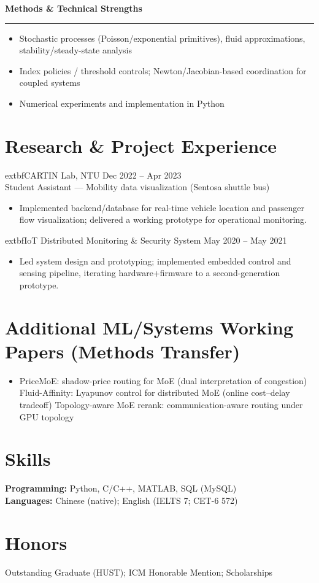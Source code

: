 \documentclass[11pt,a4paper]{article}
\newcommand{\cvsection}[1]{\vspace{2pt}\noindent\textbf{\large #1}\\[-2pt]\textcolor{cvgray}{\rule{\linewidth}{0.4pt}}\vspace{2pt}}
\begin{document}
\cvsection{Methods \& Technical Strengths}
\begin{itemize}
  \item Stochastic processes (Poisson/exponential primitives), fluid approximations, stability/steady-state analysis
  \item Index policies / threshold controls; Newton/Jacobian-based coordination for coupled systems
  \item Numerical experiments and implementation in Python
\end{itemize}

\section*{Research \& Project Experience}
	extbf{CARTIN Lab, NTU} \hfill Dec 2022 -- Apr 2023\\
Student Assistant --- Mobility data visualization (Sentosa shuttle bus)\\[-3pt]
\begin{itemize}
  \item Implemented backend/database for real-time vehicle location and passenger flow visualization; delivered a working prototype for operational monitoring.
\end{itemize}

	extbf{IoT Distributed Monitoring \& Security System} \hfill May 2020 -- May 2021\\[-3pt]
\begin{itemize}
  \item Led system design and prototyping; implemented embedded control and sensing pipeline, iterating hardware+firmware to a second-generation prototype.
\end{itemize}

\section*{Additional ML/Systems Working Papers (Methods Transfer)}
\begin{itemize}
  \item PriceMoE: shadow-price routing for MoE (dual interpretation of congestion)\;
  Fluid-Affinity: Lyapunov control for distributed MoE (online cost--delay tradeoff)\;
  Topology-aware MoE rerank: communication-aware routing under GPU topology
\end{itemize}

\section*{Skills}
\textbf{Programming:} Python, C/C++, MATLAB, SQL (MySQL)\\
\textbf{Languages:} Chinese (native); English (IELTS 7; CET-6 572)

\section*{Honors}
Outstanding Graduate (HUST); ICM Honorable Mention; Scholarships
\end{document}
